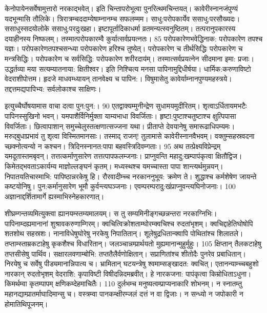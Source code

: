 केनोपायेनसर्वेषामुत्तारो नरकाद्भवेत्।
 इति चिन्तापरोभूत्वा पुनरित्थमचिन्तयत्।
 कावेरीस्नानजंपुण्यं यदभून्मासि तौलिके।
 त्रिरात्रम्चददाम्येषाम्नानम्च सफलम्मम।
 साधु:परोपकार्येव ससाधु:परसौख्यदः।
 ससाधुस्सदयोलोके ससाधु:परदुःखहा।
 इष्टापूर्तादिकाधर्मा व्रतमन्यत्स्वनुष्ठितम्।
 तत्परानुपकारस्य दयाहीनस्य निष्फलम्।
 तस्मात्परोपकारम्वै कुर्यात्सर्वप्रयत्नतः।
 85 परोपकारेणभवेद्धिनाक: परोपकारेण तपश्च यज्ञः।
 परोपकारेणतपश्चसन्ध्या परोपकारेण हरिश्च तुष्येत्।
 परोपकारेण च तीर्थसिद्धिः
परोपकारेण च मन्त्रसिद्धिः।
 परोपकारेण च सर्वसिद्धि:
परोपकारेण शरीरदाय॑म्।
 तस्मात्सर्वप्रयत्नेन सीदमाना इमा: प्रजाः।
 उद्धर्तव्या मया सत्यम्यातनाया: क्षितीश्वर।
 इति निश्चित्य मनसा पापिनामुद्दिधीर्षया।
 धार्मिक:करुणाविष्टो वेदराशीपोत्तम।
 हृदजे माधवम्ध्यायन् तानवेक्ष्य च पापिन:।
 विषुमासेतु कावेर्याम्नानपुण्यमहस्त्रये।
 तद्दत्तमद्यपापिभ्य: सर्वलोकाश्च साक्षिणः।
 

इत्युच्चैर्घोषयामास वाचा दत्वा पुन:पुन:।
 90 एतद्वाक्यम्मुनीन्द्रेण सुधामयमुदीरितम्।
 शृत्वाऽर्धितायमभटैः पापिनस्सुखिनो भवन्।
 यमपाशैर्विनिर्मुक्ता याम्यभाधा विवर्जिताः।
 हृष्टा:पुष्टाश्चतुष्टाश्च क्षुत्पिपासा विवर्जिताः।
 छित्वापाशान् समुच्चेलुस्तत्क्षणात्सज्जना यथा।
 प्रीताप्ते देवयानेषु समारूढाधिपम्यमः।
 मरुद्बुधाप्रभावं तु शृत्वा विस्मितमानसाः।
 तस्माद् राजन्! तुलामासे कावेरीस्नानवैभवम्।
 वक्तुम्सहस्रवदना च्छक्नोत्यन्यो न कश्चन।
 त्रिदिनस्नानत:पापा बहवस्त्रिदिवम्गताः।
 95 अथ तत्प्रेक्ष्यविप्रेन्द्रम् यमदूतास्तमबृवन्।
 तत्तत्कर्माणुसारेण तत्तत्पापफलम्जनाः।
 प्राप्नुवन्ति महादु:खम्पापंकृत्वा क्षितौद्विज।
 किमेतद्भवताऽकार्यम्य माज्ञोल्लङ्घनं कृतम्।
 मध्यस्थश्च यमच्चास्ता पापा शान्त्यर्थमुन्नयन्।
 निपातयतिचास्माभि: पापिष्ठान्नरकेषु हि।
 रौरवादीम्च्च नरकाननुभूय: क्रमेण ते।
 शुद्धाश्च कर्मशेषेण जायन्ते कष्टयोनिषु।
 पुन:कर्मानुसारेण भूमौ कुर्वन्त्यघञ्जनाः।
 एवम्परम्परादु:खंप्राप्नुवन्त्यघिनोजनाः।
 100 अज्ञानाद्दर्शितामार्गे ह्यस्माभिस्नेहकारणात्।
 

शीघ्रम्गन्तव्यमित्युक्त्वा ह्यानयम्स्तम्यमालयम्।
 स तु सम्यमिनीङ्गच्छन्नन्तरा नरकाग्निभिः।
 पापिनाम्दह्यमानानां शुश्रावकरुणाम्गिरम्।
 क्वचित्विक्रोशताम्घोरम्क्वचिश्च रुदतांभृशम्।
 क्वचिद्दाहेतिघोषोपि शतशोथ सहस्रशः।
 नानाविधेषुघोरेषु नरकेषु निपातितान्।
 शूलेषुद्रधितान्क्वापि पोथितांश्च शिलातले।
 तप्ताम्स्ताम्रकटाहेषु कृकशैश्च विधारितान्।
 जलञ्चान्नम्प्रार्थयतो मुह्यमानान्मुहुर्मुहुः।
 105 क्षिप्तान् तैलकटाहेषु तप्तसीसेषु पार्थिव।
 सक्षारलवणाम्बोभि: तप्ततैलैर्वणोक्षितान्।
 सप्राणितांश्च शीतोदैः पुनरेव प्रबाधितान्।
 निरयेषु च सर्वेषु पीड्यमानान्निपात्य च।
 भ्रामितान् घटयन्त्रेषु श्वमाम्सङ्खादत: क्वचित्।
 एतानन्याम्च्चबहुशो नारकान् रुदतोभृशम् वेदराशि: कृपाविष्टी विषीदन्निदमब्रवीत्।
 हे नारकजना: पापंकृत्वा किम्रोधिताऽधुना।
 किमर्थम्वा कृतम्पापम् क्षणिकम्देहमाचितैः।
 110 दुर्लभम्च मनुष्यत्वम्प्राप्यनाकारि शोभनम्।
 न स्नातम्तु महानद्याम्प्रातर्माघादिमान्सु च।
 वस्त्रम्वा पानकम्क्षीरम्जलं दत्तं न वा द्विजाः।
 न सन्ध्यो न जपोकारी न होमातिथिपूजनम्।
 

